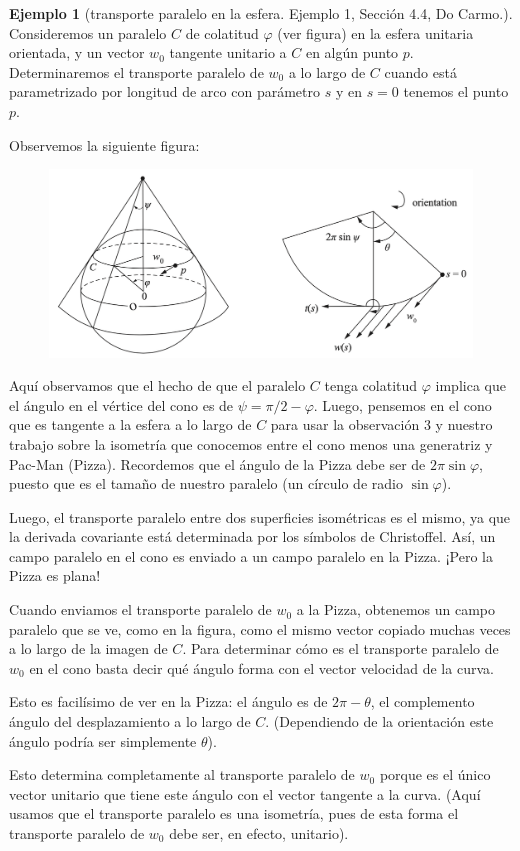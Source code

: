 \documentclass[spanish]{book}
\theoremstyle{definition}
\newtheorem*{ejem}{Ejemplo}
\begin{document}
\begin{ejem}[transporte paralelo en la esfera. Ejemplo 1, Sección 4.4, Do Carmo.]
	Consideremos un paralelo $C$ de colatitud $\varphi$ (ver figura) en la esfera unitaria orientada, y un vector $w_0$ tangente unitario a $C$ en algún punto $p$. Determinaremos el transporte paralelo de $w_0$ a lo largo de $C$ cuando está parametrizado por longitud de arco con parámetro $s$ y en $s=0$ tenemos el punto $p$.
	
	Observemos la siguiente figura:
	\begin{figure}[H]
		\centering
		\includegraphics[width=0.7\linewidth]{gauss7}
	\end{figure}
	Aquí observamos que el hecho de que el paralelo $C$ tenga colatitud $\varphi$ implica que el ángulo en el vértice del cono es de $\psi=\pi/2-\varphi$. Luego, pensemos en el cono que es tangente a la esfera a lo largo de $C$ para usar la observación 3 y nuestro trabajo sobre la isometría que conocemos entre el cono menos una generatriz y Pac-Man (Pizza). Recordemos que el ángulo de la Pizza debe ser de $2\pi\sin\varphi$, puesto que es el tamaño de nuestro paralelo (un círculo de radio $\sin\varphi$).
	
	Luego, el transporte paralelo entre dos superficies isométricas es el mismo, ya que la derivada covariante está determinada por los símbolos de Christoffel. Así, un campo paralelo en el cono es enviado a un campo paralelo en la Pizza. ¡Pero la Pizza es plana!
	
	Cuando enviamos el transporte paralelo de $w_0$ a la Pizza, obtenemos un campo paralelo que se ve, como en la figura, como el mismo vector copiado muchas veces a lo largo de la imagen de $C$. Para determinar cómo es el transporte paralelo de $w_0$ en el cono basta decir qué ángulo forma con el vector velocidad de la curva.
	
	Esto es facilísimo de ver en la Pizza: el ángulo es de $2\pi-\theta$, el complemento ángulo del desplazamiento a lo largo de $C$. (Dependiendo de la orientación este ángulo podría ser simplemente $\theta$).
	
	Esto determina completamente al transporte paralelo de $w_0$ porque es el único vector unitario que tiene este ángulo con el vector tangente a la curva. (Aquí usamos que el transporte paralelo es una isometría, pues de esta forma el transporte paralelo de $w_0$ debe ser, en efecto, unitario).
	

\end{ejem}
\end{document}
